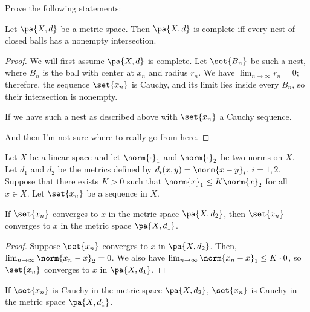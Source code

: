 \documentclass[10pt,letterpaper,twoside]{hmcpset}
\begin{document}
Prove the following statements:

\begin{problem}[1]
 Let $\pa{X,d}$ be a metric space.  Then $\pa{X,d}$ is complete iff every nest of closed balls has a nonempty intersection.
\end{problem}

\begin{solution}
 \begin{proof}
  We will first assume $\pa{X,d}$ is complete.  Let $\set{B_n}$ be such a nest, where $B_n$ is the ball with center at $x_n$ and radius $r_n$.  We have $\lim_{n\to\infty} r_n = 0$; therefore, the sequence $\set{x_n}$ is Cauchy, and its limit lies inside every $B_n$, so their intersection is nonempty.
  
  If we have such a nest as described above with $\set{x_n}$ a Cauchy sequence.
  
  And then I'm not sure where to really go from here.
 \end{proof}

\end{solution}


\begin{problem}[2]
 Let $X$ be a linear space and let $\norm{\cdot}_1$ and $\norm{\cdot}_2$ be two norms on $X$.  Let $d_1$ and $d_2$ be the metrics defined by $d_i(x,y) = \norm{x-y}_i$, $i=1,2$. Suppose that there exists $K > 0$ such that $\norm{x}_1 \leq K\norm{x}_2$ for all $x \in X$.  Let $\set{x_n}$ be a sequence in $X$.
\end{problem}

\begin{problem}[2(a)]
 If $\set{x_n}$ converges to $x$ in the metric space $\pa{X,d_2}$, then $\set{x_n}$ converges to $x$ in the metric space $\pa{X,d_1}$.
\end{problem}

\begin{solution}
  \begin{proof}
   
 Suppose $\set{x_n}$ converges to $x$ in $\pa{X,d_2}$.  Then, $\lim_{n\to\infty} \norm{x_n-x}_2 = 0$.  
 We also have $\lim_{n\to\infty} \norm{x_n - x}_1\linebreak\leq K \cdot 0$, so $\set{x_n}$ converges to $x$ in $\pa{X,d_1}$.

  \end{proof}

\end{solution}


\begin{problem}[2(b)]
 If $\set{x_n}$ is Cauchy in the metric space $\pa{X,d_2}$, $\set{x_n}$ is Cauchy in the metric space $\pa{X,d_1}$.
\end{problem}
\end{document}
